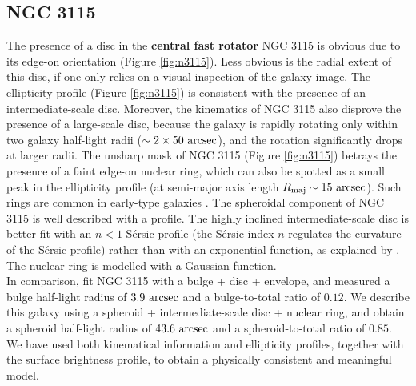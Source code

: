 \documentclass[useAMS,usenatbib,article]{mnras}
\begin{document}
\subsection{NGC 3115}
The presence of a disc in the {\bf central fast rotator} NGC 3115 is obvious due to its edge-on orientation (Figure \ref{fig:n3115}). 
Less obvious is the radial extent of this disc, if one only relies on a visual inspection of the galaxy image. 
The ellipticity profile (Figure \ref{fig:n3115}) is consistent with the presence of an intermediate-scale disc. 
Moreover, the kinematics of NGC 3115 \citep{arnold2011n3115} also disprove the presence of a large-scale disc, 
because the galaxy is rapidly rotating only within two galaxy half-light radii ($\sim 2 \times 50~\rm arcsec$), 
and the rotation significantly drops at larger radii.  
The unsharp mask of NGC 3115 (Figure \ref{fig:n3115}) betrays the presence of a faint edge-on nuclear ring, 
which can also be spotted as a small peak in the ellipticity profile 
(at semi-major axis length $R_{\rm maj} \sim 15~\rm arcsec$). 
Such rings are common in early-type galaxies \citep{michardmarchal1993}.
The spheroidal component of NGC 3115 is well described with a \cite{sersic1963} profile.
The highly inclined intermediate-scale disc is better fit with an $n<1$ S\'ersic profile 
(the S\'ersic index $n$ regulates the curvature of the S\'ersic profile) 
rather than with an exponential function, 
as explained by \cite{pastrav2013a}. 
The nuclear ring is modelled with a Gaussian function. \\
In comparison, \cite{lasker2014data} fit NGC 3115 with a bulge + disc + envelope, 
and measured a bulge half-light radius of $3.9~\rm arcsec$ and a bulge-to-total ratio of $0.12$. 
We describe this galaxy using a spheroid + intermediate-scale disc + nuclear ring, 
and obtain a spheroid half-light radius of $43.6~\rm arcsec$ and a spheroid-to-total ratio of $0.85$. 
We have used both kinematical information and ellipticity profiles, 
together with the surface brightness profile, 
to obtain a physically consistent and meaningful model. 
\end{document}
